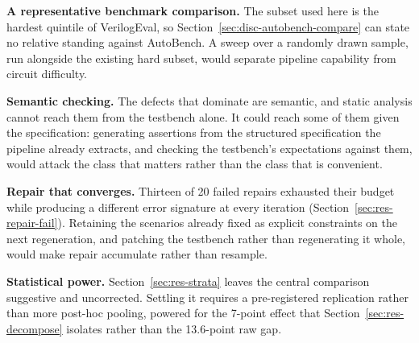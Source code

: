 \documentclass[11pt,a4paper,titlepage=false]{scrreprt}
\begin{document}
\textbf{A representative benchmark comparison.} The subset used here is the hardest quintile
of VerilogEval, so Section~\ref{sec:disc-autobench-compare} can state no relative standing
against AutoBench. A sweep over a randomly drawn sample, run alongside the existing hard
subset, would separate pipeline capability from circuit difficulty.

\textbf{Semantic checking.} The defects that dominate are semantic, and static analysis
cannot reach them from the testbench alone. It could reach some of them given the
specification: generating assertions from the structured specification the pipeline already
extracts, and checking the testbench's expectations against them, would attack the class that
matters rather than the class that is convenient.

\textbf{Repair that converges.} Thirteen of 20 failed repairs exhausted their budget while
producing a different error signature at every iteration
(Section~\ref{sec:res-repair-fail}). Retaining the scenarios already fixed as explicit
constraints on the next regeneration, and patching the testbench rather than regenerating it
whole, would make repair accumulate rather than resample.

\textbf{Statistical power.} Section~\ref{sec:res-strata} leaves the central comparison
suggestive and uncorrected. Settling it requires a pre-registered replication rather than more
post-hoc pooling, powered for the 7-point effect that Section~\ref{sec:res-decompose}
isolates rather than the 13.6-point raw gap.

\end{document}

